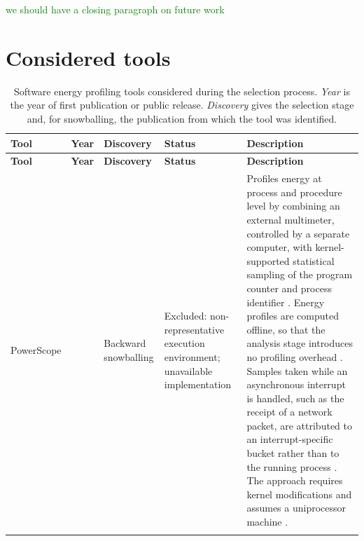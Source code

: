\documentclass[
  acmsmall,
  screen,
  review,
  xcolor={dvipsnames,usenames}
]{acmart}
\newcommand{\iness}[1]{\textcolor{green}{#1}}
\begin{document}
\iness{we should have a closing paragraph on future work}





\appendix

\section{Considered tools}\label{app:considered-tools}

{\footnotesize
\setlength{\tabcolsep}{3pt}
\begin{longtable}{@{}>{\raggedright\arraybackslash}p{2.1cm}>{\raggedright\arraybackslash}p{0.7cm}>{\raggedright\arraybackslash}p{2.0cm}>{\raggedright\arraybackslash}p{2.0cm}>{\raggedright\arraybackslash}p{\dimexpr\linewidth-6.8cm-8\tabcolsep\relax}@{}}
\caption{Software energy profiling tools considered during the selection process. \emph{Year} is the year of first publication or public release. \emph{Discovery} gives the selection stage and, for snowballing, the publication from which the tool was identified.}
\label{tab:considered-tools}\\
\toprule
\textbf{Tool} & \textbf{Year} & \textbf{Discovery} & \textbf{Status} & \textbf{Description}\\
\midrule
\endfirsthead
\toprule
\textbf{Tool} & \textbf{Year} & \textbf{Discovery} & \textbf{Status} & \textbf{Description}\\
\midrule
\endhead
\bottomrule
\endfoot

PowerScope \cite{flinnPowerScopeToolProfiling1999} & 1999 & Backward snowballing \cite{noureddineReviewEnergyMeasurement2013} & Excluded: non-representative execution environment; unavailable implementation &
Profiles energy at process and procedure level by combining an external multimeter, controlled by a separate computer, with kernel-supported statistical sampling of the program counter and process identifier \cite{flinnPowerScopeToolProfiling1999}. Energy profiles are computed offline, so that the analysis stage introduces no profiling overhead \cite{noureddineReviewEnergyMeasurement2013}. Samples taken while an asynchronous interrupt is handled, such as the receipt of a network packet, are attributed to an interrupt-specific bucket rather than to the running process \cite{flinnPowerScopeToolProfiling1999}. The approach requires kernel modifications and assumes a uniprocessor machine \cite{flinnPowerScopeToolProfiling1999,noureddineReviewEnergyMeasurement2013}.\\
\addlinespace


\end{longtable}}
\end{document}
